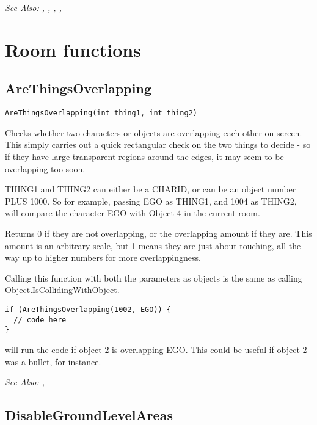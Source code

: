 \it{See Also:} , ,
, 
, 



\section{Room functions}%


\subsection{AreThingsOverlapping}\label{AreThingsOverlapping}%

\begin{verbatim}
AreThingsOverlapping(int thing1, int thing2)
\end{verbatim}
Checks whether two characters or objects are overlapping each other on screen. This simply
carries out a quick rectangular check on the two things to decide - so if they have large
transparent regions around the edges, it may seem to be overlapping too soon.

THING1 and THING2 can either be a CHARID, or can be an object number PLUS 1000.
So for example, passing EGO as THING1, and 1004 as THING2, will compare the character EGO
with Object 4 in the current room.

Returns 0 if they are not overlapping, or the overlapping amount if they are. This amount
is an arbitrary scale, but 1 means they are just about touching, all the way up to higher numbers
for more overlappingness.

Calling this function with both the parameters as objects is the same as calling Object.IsCollidingWithObject.

\begin{verbatim}
if (AreThingsOverlapping(1002, EGO)) {
  // code here
}
\end{verbatim}
will run the code if object 2 is overlapping EGO. This could be useful if object 2 was a bullet,
for instance.

\it{See Also:} ,



\subsection{DisableGroundLevelAreas}\label{DisableGroundLevelAreas}%

